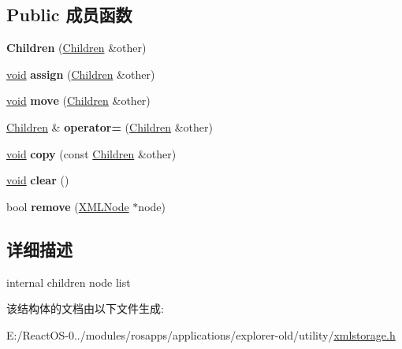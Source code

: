 \subsection*{Public 成员函数}
\begin{DoxyCompactItemize}
\item 
\mbox{\label{struct_x_m_l_storage_1_1_x_m_l_node_1_1_children_ad5ae145f37b6ccd58a89c8479607462a}} 
{\bfseries Children} (\hyperlink{struct_x_m_l_storage_1_1_x_m_l_node_1_1_children}{Children} \&other)
\item 
\mbox{\label{struct_x_m_l_storage_1_1_x_m_l_node_1_1_children_abceb56024a4bc78a43509a7937535826}} 
\hyperlink{interfacevoid}{void} {\bfseries assign} (\hyperlink{struct_x_m_l_storage_1_1_x_m_l_node_1_1_children}{Children} \&other)
\item 
\mbox{\label{struct_x_m_l_storage_1_1_x_m_l_node_1_1_children_a1dfe74e759a664a0486e580d34019f93}} 
\hyperlink{interfacevoid}{void} {\bfseries move} (\hyperlink{struct_x_m_l_storage_1_1_x_m_l_node_1_1_children}{Children} \&other)
\item 
\mbox{\label{struct_x_m_l_storage_1_1_x_m_l_node_1_1_children_a280088ae242b6a2440c714ce37a3b251}} 
\hyperlink{struct_x_m_l_storage_1_1_x_m_l_node_1_1_children}{Children} \& {\bfseries operator=} (\hyperlink{struct_x_m_l_storage_1_1_x_m_l_node_1_1_children}{Children} \&other)
\item 
\mbox{\label{struct_x_m_l_storage_1_1_x_m_l_node_1_1_children_aa3e639cdba150abe233bd586861187ed}} 
\hyperlink{interfacevoid}{void} {\bfseries copy} (const \hyperlink{struct_x_m_l_storage_1_1_x_m_l_node_1_1_children}{Children} \&other)
\item 
\mbox{\label{struct_x_m_l_storage_1_1_x_m_l_node_1_1_children_a0add29925ab46a06158755dfacf266c1}} 
\hyperlink{interfacevoid}{void} {\bfseries clear} ()
\item 
\mbox{\label{struct_x_m_l_storage_1_1_x_m_l_node_1_1_children_a79f3501a608e9f5c1ea9c4a54d686990}} 
bool {\bfseries remove} (\hyperlink{struct_x_m_l_storage_1_1_x_m_l_node}{X\+M\+L\+Node} $\ast$node)
\end{DoxyCompactItemize}


\subsection{详细描述}
internal children node list 

该结构体的文档由以下文件生成\+:\begin{DoxyCompactItemize}
\item 
E\+:/\+React\+O\+S-\/0../modules/rosapps/applications/explorer-\/old/utility/\hyperlink{xmlstorage_8h}{xmlstorage.\+h}\end{DoxyCompactItemize}
